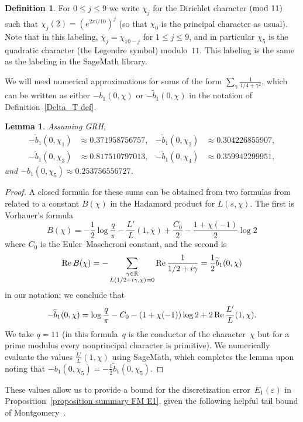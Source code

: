 \documentclass[11pt]{article}
\theoremstyle{plain}
\newtheorem{lemma}[thm]{Lemma}
\theoremstyle{definition}
\newtheorem{definition}[thm]{Definition}
\numberwithin{equation}{section}
\renewcommand{\mod}[1]{{\ifmmode\text{\rm\ (mod~$#1$)}\else\discretionary{}{}{\hbox{\!\!}}\rm(mod~$#1$)\fi}}
\renewcommand{\Re}{\mathop{\rm Re}}
\renewcommand{\bar}{\overline}
\newcommand{\R}{\mathbb R}
\newcommand{\0}{{\vec 0}}
\begin{document}
\begin{definition} \label{labeling characters}
For $0\le j\le 9$ we write $\chi_j$ for the Dirichlet character$\mod{11}$ such that $\chi_j(2) = (e^{2\pi i/10})^j$ (so that $\chi_0$ is the principal character as usual). Note that in this labeling, $\bar\chi_j = \chi_{10-j}$ for $1\le j\le 9$, and in particular $\chi_5$ is the quadratic character (the Legendre symbol) modulo~$11$. This labeling is the same as the labeling in the SageMath library.
\end{definition}

We will need numerical approximations for sums of the form $\sum_\gamma \frac1{1/4+\gamma^2}$, which can be written as either $-b_1(0,\chi)$ or $-\widetilde b_1(0,\chi)$ in the notation of Definition~\ref{Delta_T def}.

\begin{lemma} \label{numerical gamma sums}
Assuming GRH,
\begin{align*}
-\widetilde b_1(0,\chi_1) &\approx 0.371958756757, &
-\widetilde b_1(0,\chi_2) &\approx 0.304226855907, \\
-\widetilde b_1(0,\chi_3) &\approx 0.817510797013, &
-\widetilde b_1(0,\chi_4) &\approx 0.359942299951,
\end{align*}
and $-b_1(0,\chi_5) \approx 0.253756556727$.
\end{lemma}

\begin{proof}
A closed formula for these sums can be obtained from two formulas from~\cite[Corollary~10.18]{MV} related to a constant $B(\chi)$ in the Hadamard product for $L(s,\chi)$. The first is Vorhauer's formula
\[
B(\chi) = -\frac12\log\frac q\pi - \frac{L'}L(1,\bar\chi) + \frac{C_0}2 - \frac{1+\chi(-1)}2\log2
\]
where $C_0$ is the Euler--Mascheroni constant, and the second is
\[
\Re B(\chi) = -\sum_{\substack{\gamma\in\R \\ L(1/2+i\gamma,\chi)=0}} \Re\frac1{1/2+i\gamma} = \frac12 \widetilde b_1(0,\chi)
\]
in our notation; we conclude that
\[
-\widetilde b_1(0,\chi) = \log \frac{q}{\pi}-C_0-(1+\chi(-1))\log 2+2\Re \frac{L'}{L}(1,\chi).
\]
We take $q=11$ (in this formula~$q$ is the conductor of the character~$\chi$ but for a prime modulus every nonprincipal character is primitive). We numerically evaluate the values $\frac{L'}{L}(1,\chi)$ using SageMath, which completes the lemma upon noting that $-b_1(0,\chi_5) = -\frac12\widetilde b_1(0,\chi_5)$.
\end{proof}

These values allow us to provide a bound for the discretization error~$E_1(\varepsilon)$ in Proposition~\ref{proposition summary FM E1}, given the following helpful tail bound of Montgomery~\cite[Theorem~1 of Section~3]{Montgomery80}.
\end{document}
